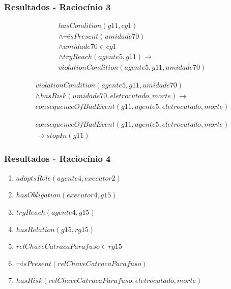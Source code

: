 \documentclass{beamer}
\begin{document}
\begin{frame}
	\frametitle{Resultados - Raciocínio 3}
	\begin{eqnarray}
		hasCondition(g11,cg1) \nonumber \\ 
		\wedge \neg isPresent(umidade70) \nonumber \\
		\wedge umidade70 \in cg1 \nonumber \\
		\wedge tryReach(agente5,g11) \to \nonumber \\  
		violationCondition(agente5,g11,umidade70) 
	\end{eqnarray}

	\begin{eqnarray} \nonumber
		violationCondition(agente5,g11,umidade70) \nonumber \\
		\wedge hasRisk(umidade70,eletrocutado,morte) \to \nonumber \\  
		consequenceOfBadEvent(g11,agente5,eletrocutado,morte)
	\end{eqnarray}

	\begin{eqnarray}
		consequenceOfBadEvent(g11,agente5,eletrocutado,morte) \\ \nonumber \to stopIn(g11) \nonumber
	\end{eqnarray}	
\end{frame}

\begin{frame}
	\frametitle{Resultados - Raciocínio 4}
	\begin{enumerate}
		\item $adoptsRole(agente4,executor2)$
		\item $hasObligation(executor4,g15)$	
		\item $tryReach(agente4,g15)$ 
		\item $hasRelation(g15,rg15)$
		\item $relChaveCatracaParafuso \in rg15$	
		\item $\neg isPresent(relChaveCatracaParafuso)$
		\item $hasRisk(relChaveCatracaParafuso,eletrocutado,morte)$
	\end{enumerate}
\end{frame}
\end{document}
